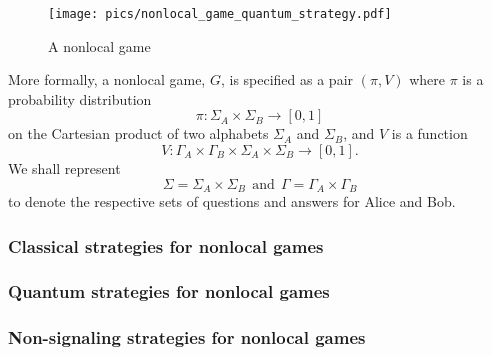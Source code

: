 \documentclass[nofootinbib,superscriptaddress,a4paper,twocolumn,longbibliography,floatfix,pra]{revtex4-2}
\begin{document}
\begin{figure}[!htpb]
    \centering
    \texttt{[image: pics/nonlocal\_game\_quantum\_strategy.pdf]}
    \caption{A nonlocal game}
    \label{fig:nonlocal_game}
\end{figure}

More formally, a nonlocal game, $G$, is specified as a pair $(\pi, V)$ where
$\pi$ is a probability distribution
\begin{equation}
    \pi : \Sigma_A \times \Sigma_B \rightarrow [0,1]
\end{equation}
on the Cartesian product of two alphabets $\Sigma_A$ and $\Sigma_B$, and $V$ is
a function
\begin{equation}
    V : \Gamma_A \times \Gamma_B \times \Sigma_A \times \Sigma_B \rightarrow [0,1].
\end{equation}
We shall represent
\begin{equation}
    \Sigma = \Sigma_A \times \Sigma_B 
    \ \ \text{and} \ \ 
    \Gamma = \Gamma_A \times \Gamma_B
\end{equation}
to denote the respective sets of questions and answers for Alice and Bob.


\subsubsection{Classical strategies for nonlocal games}
\label{sec:classical_strategies_for_nonlocal_games}

\subsubsection{Quantum strategies for nonlocal games}
\label{sec:quantum_strategies_for_nonlocal_games}

\subsubsection{Non-signaling strategies for nonlocal games}
\label{sec:non_signaling_strategies_for_nonlocal_games}
\end{document}
